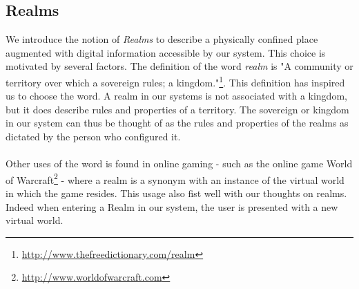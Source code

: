 \subsection{Realms} %
\label{sub:realms}
We introduce the notion of \emph{Realms} to describe a physically confined place augmented with digital information accessible by our system. This choice is motivated by several factors. The definition of the word \emph{realm} is "A community or territory over which a sovereign rules; a kingdom."\footnote{\url{http://www.thefreedictionary.com/realm}}. This definition has inspired us to choose the word. A realm in our systems is not associated with a kingdom, but it does describe rules and properties of a territory. The sovereign or kingdom in our system can thus be thought of as the rules and properties of the realms as dictated by the person who configured it. 
\\\\
Other uses of the word is found in online gaming - such as the online game World of Warcraft\footnote{\url{http://www.worldofwarcraft.com}} - where a realm is a synonym with an instance of the virtual world in which the game resides. This usage also fist well with our thoughts on realms. Indeed when entering a Realm in our system, the user is presented with a new virtual world.


